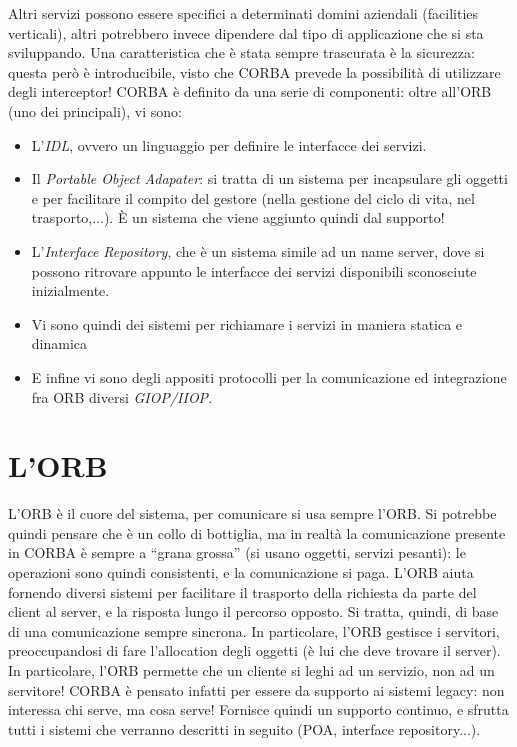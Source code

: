 Altri servizi possono essere specifici a determinati domini aziendali (facilities verticali), altri potrebbero invece dipendere dal tipo di
applicazione che si sta sviluppando.
Una caratteristica che è stata sempre trascurata è la sicurezza: questa però è introducibile, visto che CORBA prevede
la possibilità di utilizzare degli interceptor!
CORBA è definito da una serie di componenti: oltre all'ORB (uno dei principali), vi sono:
\begin{itemize}
 \item L'\textit{IDL}, ovvero un linguaggio per definire le interfacce dei servizi.
 \item Il \textit{Portable Object Adapater}: si tratta di un sistema per incapsulare gli oggetti e per facilitare il
compito del gestore (nella gestione del ciclo di vita, nel trasporto,...). È un sistema che viene aggiunto quindi dal supporto!
 \item L'\textit{Interface Repository}, che è un sistema simile ad un name server, dove si possono ritrovare appunto le interfacce dei servizi disponibili sconosciute inizialmente.
 \item Vi sono quindi dei sistemi per richiamare i servizi in maniera statica e dinamica
 \item E infine vi sono degli appositi protocolli per la comunicazione ed integrazione fra ORB diversi \textit{GIOP/IIOP}.
\end{itemize}
\section{L'ORB}
L'ORB è il cuore del sistema, per comunicare si usa sempre l'ORB. Si potrebbe quindi pensare che è un collo di
bottiglia, ma in realtà la comunicazione presente in CORBA è sempre a ``grana grossa'' (si usano oggetti, servizi
pesanti): le operazioni sono quindi consistenti, e la comunicazione si paga. L'ORB aiuta fornendo diversi sistemi per
facilitare il trasporto della richiesta da parte del client al server, e la risposta lungo il percorso opposto. Si
tratta, quindi, di base di una comunicazione sempre sincrona.
In particolare, l'ORB gestisce i servitori, preoccupandosi di fare l'allocation degli oggetti (è lui che deve trovare il
server). In particolare, l'ORB permette che un cliente si leghi ad un servizio, non ad un servitore! CORBA è pensato
infatti per essere da supporto ai sistemi legacy: non interessa chi serve, ma cosa serve! Fornisce quindi un supporto
continuo, e sfrutta tutti i sistemi che verranno descritti in seguito (POA, interface repository...).
